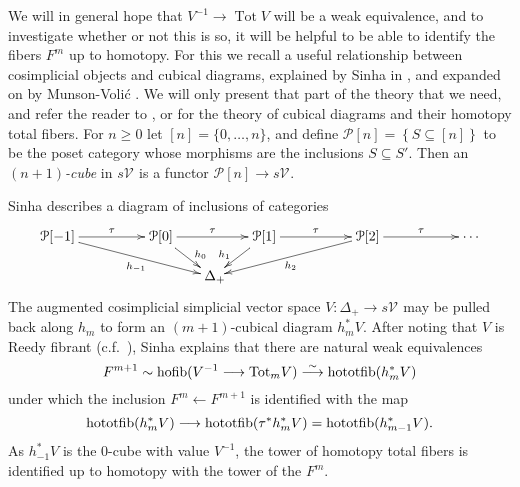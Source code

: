 \documentclass[11pt]{amsart} \renewcommand{\baselinestretch}{1.4}
\theoremstyle{plain}
\theoremstyle{definition}
\DeclareMathOperator{\Tot}{Tot}
\DeclareMathOperator*{\hofib}{hofib}
\renewcommand{\to}{\longrightarrow}
\newcommand{\from}{\longleftarrow}
\newcommand{\calP}{\mathcal{P}}
\newcommand{\calV}{\mathcal{V}}
\newcommand{\citeBOX}[2][]{\cite[\mbox{#1}]{#2}}
\newcommand{\vect}[2]{\calV^{#1}_{#2}}
\begin{document}
\begin{Conventions and notation}
We will in general hope that $V^{-1}\to \Tot V$ will be a weak equivalence, and to investigate whether or not this is so, it will be helpful to be able to identify the fibers $F^m$ up to homotopy.
For this we recall a useful relationship between cosimplicial objects and cubical diagrams, explained by Sinha in \cite[Theorem 6.5]{SinhaSpacesOfKnots.pdf}, and expanded on by Munson-Voli\'c \cite{CubicalHomotopyTheory.pdf}. We will only present that part of the theory that we need, and refer the reader to \cite{GoodwillieCalcII}, \cite{LuisGoodwillie.pdf} or \cite{CubicalHomotopyTheory.pdf} for the  theory of cubical diagrams and their homotopy total fibers. For $n\geq0$ let $[n]=\{0,\ldots,n\}$, and define $\calP[n]=\left\{S\subseteq [n]\right\}$ to be the poset category whose morphisms are the inclusions $S\subseteq S'$. Then an \emph{$(n+1)$-cube} in $s\vect{}{}$ is a functor $\calP[n]\to s\vect{}{}$.


Sinha describes a diagram of inclusions of categories
\[\xymatrix@!0@R=10mm@C=13mm{
\calP[-1]\ar[rr]^-{\tau}\ar_-{h_{-1}}[drrr]
&&%
\calP[0]\ar[rr]^-{\tau}\ar^(.65){\!h_{0}}[dr]
&&%
\calP[1]\ar[rr]^-{\tau}\ar_(.65){h_{1}\!}[dl]
&&%
\calP[2]\ar[rr]^-{\tau}\ar^-{h_{2}}[dlll]
&&%
\cdots \\
&&&\Delta_+\!\!
}\]
The augmented cosimplicial simplicial vector space $V:\Delta_+\to s\vect{}{}$ may be pulled back along $h_m$ to form an $(m+1)$-cubical diagram $h_m^*V$. After noting that $V$ is Reedy fibrant (c.f.\ \citeBOX[{X.4.9}]{YellowMonster}), Sinha explains that there are natural weak equivalences 
\[F^{m+1}\sim\hofib(V^{-1}\to\textup{Tot}_mV) \overset{\smash{\sim}}{\to} \textup{hototfib}(h_m^*V)\]
under which the inclusion $F^m\from F^{m+1}$
is identified with the map
\[\textup{hototfib}(h_m^*V)\to \textup{hototfib}(\tau^*h_m^*V)=\textup{hototfib}(h_{m-1}^*V).\]
As $h_{-1}^*V$ is the 0-cube with value $V^{-1}$, the tower of homotopy total fibers is identified up to homotopy with the tower of the $F^m$.


\end{Conventions and notation}
\end{document}
